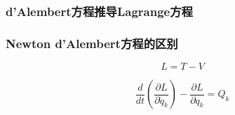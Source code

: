 \documentclass[12pt]{article}
\numberwithin{equation}{section}
\begin{document}
	\subsubsection{d'Alembert方程推导Lagrange方程}

	\subsubsection{Newton d'Alembert方程的区别}
        \begin{equation}
            L=T-V
        \end{equation}

        \begin{equation}
            \frac{d}{dt}\left(\frac{\partial L}{\partial \dot{q}_k}\right)-\frac{\partial L}{\partial q_k}=Q_k
        \end{equation}

        
        
    
\end{document}
